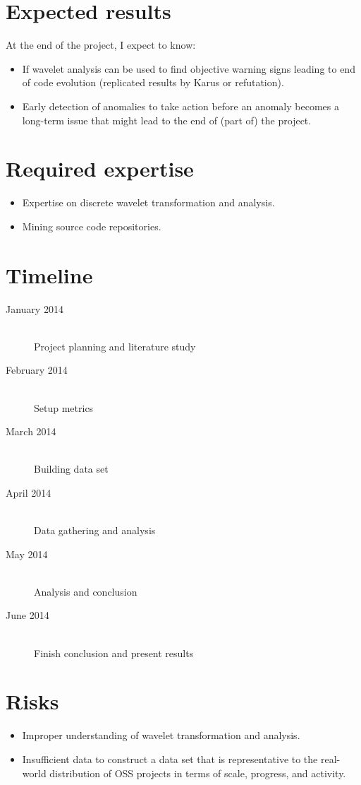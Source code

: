 


\section{Expected results}
At the end of the project, I expect to know:
\begin{itemize}
	\item If wavelet analysis can be used to find objective warning signs leading
	to end of code evolution (replicated results by Karus or refutation).
	\item Early detection of anomalies to take action before an anomaly becomes a
	long-term issue that might lead to the end of (part of) the project.
\end{itemize}

\section{Required expertise}
\begin{itemize}
	\item Expertise on discrete wavelet transformation and analysis.
	\item Mining source code repositories.
\end{itemize}

\section{Timeline}
\begin{description}
	\item[January 2014] \hfill \\ Project planning and literature study
	\item[February 2014] \hfill \\ Setup metrics
	\item[March 2014] \hfill \\ Building data set
	\item[April 2014] \hfill \\ Data gathering and analysis
	\item[May 2014] \hfill \\ Analysis and conclusion
	\item[June 2014] \hfill \\ Finish conclusion and present results
\end{description}

\section{Risks}
\begin{itemize}
	\item Improper understanding of wavelet transformation and analysis.
	\item Insufficient data to construct a data set that is representative to the
	real-world distribution of OSS projects in terms of scale, progress, and
	activity.
\end{itemize}